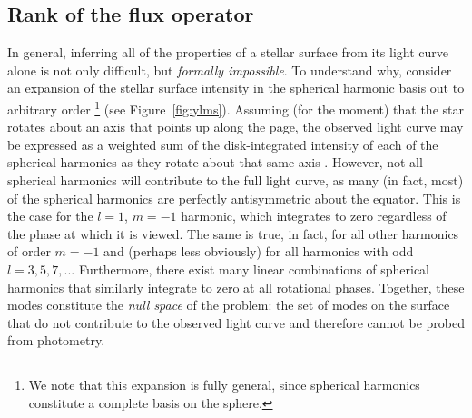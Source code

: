 \documentclass[modern]{aastex62}
\begin{document}
\subsection{Rank of the flux operator}
%
In general, inferring all of the properties of a stellar surface from its light curve alone
is not
only difficult, but \emph{formally impossible}. To understand why, consider
an expansion of the stellar surface intensity in the spherical
harmonic basis out to arbitrary order%
\footnote{%
    We note that this expansion is fully general, since spherical harmonics
    constitute a complete basis on the sphere.
} (see Figure~\ref{fig:ylms}).
Assuming (for the moment) that the
star rotates about an axis that points up along the page, the observed
light curve may be expressed as a weighted sum of the disk-integrated intensity
of each of the spherical harmonics as they rotate about that same axis \citep{Luger2019}.
However, not all spherical harmonics will contribute to the full light curve,
as many (in fact, most) of the spherical harmonics are perfectly antisymmetric
about the equator. This is the case for
the $l = 1$, $m = -1$ harmonic, which integrates to zero regardless of
the phase at which it is viewed. The same is true, in fact, for all other harmonics
of order $m = -1$ and (perhaps less obviously) for all harmonics with odd
$l = 3, 5, 7, ...$ Furthermore, there exist many linear combinations of
spherical harmonics that similarly integrate to zero at all rotational
phases. Together, these modes constitute the \emph{null space} of the problem:
the set of modes on the surface that do not contribute to the observed
light curve and therefore cannot be probed from photometry.
\end{document}
